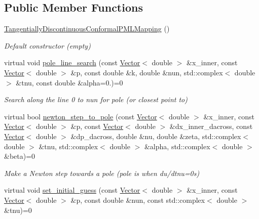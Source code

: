 \subsection*{Public Member Functions}
\begin{DoxyCompactItemize}
\item 
\hyperlink{classoomph_1_1TangentiallyDiscontinuousConformalPMLMapping_a4c7160c00452fbc7b8d327e51cf53f0a}{Tangentially\+Discontinuous\+Conformal\+P\+M\+L\+Mapping} ()
\begin{DoxyCompactList}\small\item\em Default constructor (empty) \end{DoxyCompactList}\item 
virtual void \hyperlink{classoomph_1_1TangentiallyDiscontinuousConformalPMLMapping_abfe7b52c89d359601d51de9df3320482}{pole\+\_\+line\+\_\+search} (const \hyperlink{classoomph_1_1Vector}{Vector}$<$ double $>$ \&x\+\_\+inner, const \hyperlink{classoomph_1_1Vector}{Vector}$<$ double $>$ \&p, const double \&k, double \&nun, std\+::complex$<$ double $>$ \&tnu, const double \&alpha=0.)=0
\begin{DoxyCompactList}\small\item\em Search along the line 0 to nun for pole (or closest point to) \end{DoxyCompactList}\item 
virtual bool \hyperlink{classoomph_1_1TangentiallyDiscontinuousConformalPMLMapping_af66825e74360069055fc22d4537895a7}{newton\+\_\+step\+\_\+to\+\_\+pole} (const \hyperlink{classoomph_1_1Vector}{Vector}$<$ double $>$ \&x\+\_\+inner, const \hyperlink{classoomph_1_1Vector}{Vector}$<$ double $>$ \&p, const \hyperlink{classoomph_1_1Vector}{Vector}$<$ double $>$ \&dx\+\_\+inner\+\_\+dacross, const \hyperlink{classoomph_1_1Vector}{Vector}$<$ double $>$ \&dp\+\_\+dacross, double \&nu, double \&zeta, std\+::complex$<$ double $>$ \&tnu, std\+::complex$<$ double $>$ \&alpha, std\+::complex$<$ double $>$ \&beta)=0
\begin{DoxyCompactList}\small\item\em Make a Newton step towards a pole (pole is when du/dtnu=0s) \end{DoxyCompactList}\item 
virtual void \hyperlink{classoomph_1_1TangentiallyDiscontinuousConformalPMLMapping_aedd395353a762c78bea667920c57956c}{set\+\_\+initial\+\_\+guess} (const \hyperlink{classoomph_1_1Vector}{Vector}$<$ double $>$ \&x\+\_\+inner, const \hyperlink{classoomph_1_1Vector}{Vector}$<$ double $>$ \&p, const double \&nun, const std\+::complex$<$ double $>$ \&tnu)=0
\end{DoxyCompactItemize}


